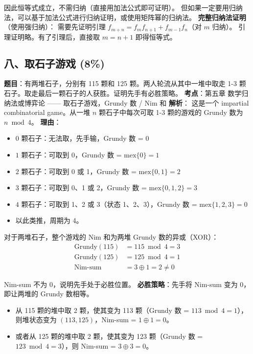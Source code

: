 \documentclass[10pt,a4paper,openany]{ctexbook}
\theoremstyle{definition}
\theoremstyle{remark}
\begin{document}
因此恒等式成立，不需归纳（直接用加法公式即可证明）。
但如果一定要用归纳法，可以基于加法公式进行归纳证明，或使用矩阵幂的归纳法。
\textbf{完整归纳法证明}（使用强归纳）：
需要先证明引理 $f_{m+n} = f_m f_{n+1} + f_{m-1} f_n$（对 $m$ 归纳）。
引理证明略。有了引理后，直接取 $m = n+1$ 即得恒等式。
\vspace{-2pt}

\subsection{八、取石子游戏 (8\%)}

\textbf{题目}：有两堆石子，分别有 115 颗和 125 颗。两人轮流从其中一堆中取走 1-3 颗石子。取走最后一颗石子的人获胜。证明先手有必胜策略。
\textbf{考点}：第五章 数学归纳法或博弈论 —— 取石子游戏，Grundy 数 / Nim 和
\textbf{解析}：
这是一个 impartial combinatorial game。从一堆 $n$ 颗石子中每次可取 1-3 颗的游戏的 Grundy 数为 $n \bmod 4$。
\textbf{理由}：
\begin{itemize}
\item $0$ 颗石子：无法取，先手输，Grundy 数 = 0
\item $1$ 颗石子：可取到 0，Grundy 数 = $\mathrm{mex}\{0\} = 1$
\item $2$ 颗石子：可取到 0 或 1，Grundy 数 = $\mathrm{mex}\{0, 1\} = 2$
\item $3$ 颗石子：可取到 0、1 或 2，Grundy 数 = $\mathrm{mex}\{0, 1, 2\} = 3$
\item $4$ 颗石子：可取到 1、2 或 3（状态 1、2、3），Grundy 数 = $\mathrm{mex}\{1, 2, 3\} = 0$
\item 以此类推，周期为 4。

\end{itemize}

对于两堆石子，整个游戏的 Nim 和为两堆 Grundy 数的异或（XOR）：
\[
\begin{aligned}
\text{Grundy}(115) &= 115 \bmod 4 = 3 \\
\text{Grundy}(125) &= 125 \bmod 4 = 1 \\
\text{Nim-sum} &= 3 \oplus 1 = 2 \neq 0
\end{aligned}
\]

Nim-sum 不为 0，说明先手处于必胜位置。
\textbf{必胜策略}：先手将 Nim-sum 变为 0，即让两堆的 Grundy 数相等。
\begin{itemize}
\item 从 115 颗的堆中取 2 颗，使其变为 113 颗（Grundy 数 = $113 \bmod 4 = 1$），则堆状态变为 $(113, 125)$，Nim-sum = $1 \oplus 1 = 0$。
\item 或者从 125 颗的堆中取 2 颗，使其变为 123 颗（Grundy 数 = $123 \bmod 4 = 3$），则 Nim-sum = $3 \oplus 3 = 0$。

\end{itemize}
\end{document}
